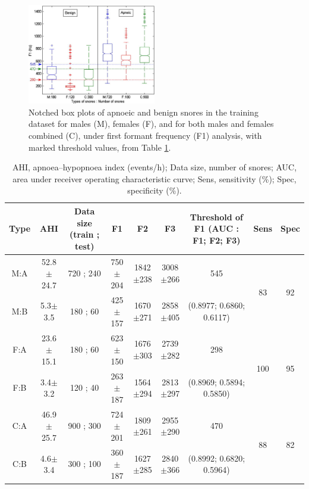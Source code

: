 \begin{figure}[h]
\centering 
\includegraphics[width=0.5\textwidth]{drawings/ng2008afig1}
\caption{Notched box plots of apnoeic and benign snores in the training dataset for males (M), females (F), and for both males and females combined (C), under first formant frequency (F1) analysis, with marked threshold values, from Table \ref{table:ng2008aformantstable1}. ~\cite{ng2008could}}
\label{fig: ng2008afig1}
\end{figure}
\begin{table}[h]
\centering
\begin{tabular}{c c c c c c c c c}
\toprule
Type&AHI&Data size (train ; test)&F1&F2&F3&Threshold of F1 (AUC : F1; F2; F3)&Sens&Spec\\ \midrule
M:A&52.8$\pm$24.7&720 ; 240&750$\pm$204&1842$\pm$238&3008$\pm$266&545&\multirow{2}{*}{83}&\multirow{2}{*}{92}\\ 
M:B&5.3$\pm$3.5&180 ; 60&425$\pm$157&1670$\pm$271&2858$\pm$405&(0.8977; 0.6860; 0.6117)&&\\ 
F:A&23.6$\pm$15.1&180 ; 60&623$\pm$150&1676$\pm$303&2739$\pm$282&298&\multirow{2}{*}{100}&\multirow{2}{*}{95}\\ 
F:B&3.4$\pm$3.2&120 ; 40&263$\pm$187&1564$\pm$294&2813$\pm$297&(0.8969; 0.5894; 0.5850)&&\\ 
C:A&46.9$\pm$25.7&900 ; 300&724$\pm$201&1809$\pm$261&2955$\pm$290&470&\multirow{2}{*}{88}&\multirow{2}{*}{82}\\ 
C:B&4.6$\pm$3.4&300 ; 100&360$\pm$187&1627$\pm$285&2840$\pm$366&(0.8992; 0.6820; 0.5964)&&\\ \bottomrule
\end{tabular}
\caption{AHI, apnoea–hypopnoea index (events/h); Data size, number of snores; AUC, area under receiver operating characteristic curve; Sens, sensitivity (\%); Spec, specificity (\%).}
\label{table:ng2008aformantstable1}
\end{table}
